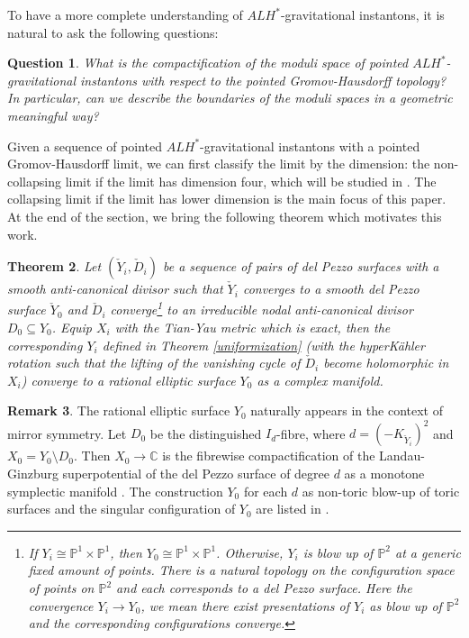 \documentclass[11pt]{amsart}
\theoremstyle{plain}
\newtheorem{thm}{Theorem}[section]
\newtheorem{que}[thm]{Question}
\theoremstyle{definition}
\newtheorem{rk}[thm]{Remark}
\numberwithin{equation}{section}
\begin{document}
  To have a more complete understanding of $ALH^*$-gravitational instantons, it is natural to ask the following questions:
  \begin{que}
  		 What is the compactification of the moduli space of pointed $ALH^*$-gravitational instantons with respect to the pointed Gromov-Hausdorff topology? In particular, can we describe the boundaries of the moduli spaces in a geometric meaningful way?   		
  \end{que}
  Given a sequence of pointed $ALH^*$-gravitational instantons with a pointed Gromov-Hausdorff limit, we can first classify the limit by the dimension: the non-collapsing limit if the limit has dimension four, which will be studied in \cite{LSZ}. The collapsing limit if the limit has lower dimension is the main focus of this paper. At the end of the section, we bring the following theorem which motivates this work. 
  \begin{thm} \cite{LLL} \label{LLL} 
  	 Let $(\check{Y}_i,\check{D}_i)$ be a sequence of pairs of del Pezzo surfaces with a smooth anti-canonical divisor such that $\check{Y}_i$ converges to a smooth del Pezzo surface $\check{Y}_0$ and $\check{D}_i$ converge\footnote{If $Y_i\cong \mathbb{P}^1\times \mathbb{P}^1$, then $Y_0\cong \mathbb{P}^1\times \mathbb{P}^1$. Otherwise, $Y_i$ is blow up of $\mathbb{P}^2$ at a generic fixed amount of points. There is a natural topology on the configuration space of points on $\mathbb{P}^2$ and each corresponds to a del Pezzo surface. Here the convergence $Y_i\rightarrow Y_0$, we mean there exist presentations of $Y_i$ as blow up of $\mathbb{P}^2$ and the corresponding configurations converge.} to an irreducible nodal anti-canonical divisor $D_0\subseteq Y_0$. Equip $X_i$ with the Tian-Yau metric which is exact, then the corresponding ${Y}_i$ defined in Theorem \ref{uniformization} (with the hyperK\"ahler rotation such that the lifting of the vanishing cycle of $\check{D}_i$ become holomorphic in ${X}_i$) converge to a rational elliptic surface ${Y}_0$ as a complex manifold. 
  \end{thm}
\begin{rk}\label{rk LLL2}
	The rational elliptic surface $Y_0$ naturally appears in the context of mirror symmetry. Let $D_0$ be the distinguished $I_d$-fibre, where $d=(-K_{\check{Y}_i})^2$ and $X_0=Y_0\setminus D_0$. Then $X_0\rightarrow \mathbb{C}$ is the fibrewise compactification of the Landau-Ginzburg superpotential of the del Pezzo surface of degree $d$ as a monotone symplectic manifold \cite[Theorem 1.4]{LLL}. The construction $Y_0$ for each $d$ as non-toric blow-up of toric surfaces and the singular configuration of $Y_0$ are listed in \cite[Appendix A]{LLL}.
\end{rk}	
\end{document}
